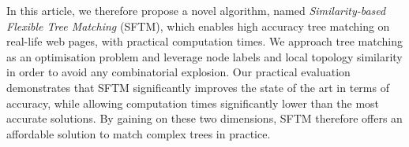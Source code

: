In this article, we therefore propose a novel algorithm, named \emph{Similarity-based Flexible Tree Matching} (SFTM), which enables high accuracy tree matching on real-life web pages, with practical computation times.
We approach tree matching as an optimisation problem and leverage node labels and local topology similarity in order to avoid any combinatorial explosion.
Our practical evaluation demonstrates that SFTM significantly improves the state of the art in terms of accuracy, while allowing computation times significantly lower than the most accurate solutions.
By gaining on these two dimensions, SFTM therefore offers an affordable solution to match complex trees in practice.

